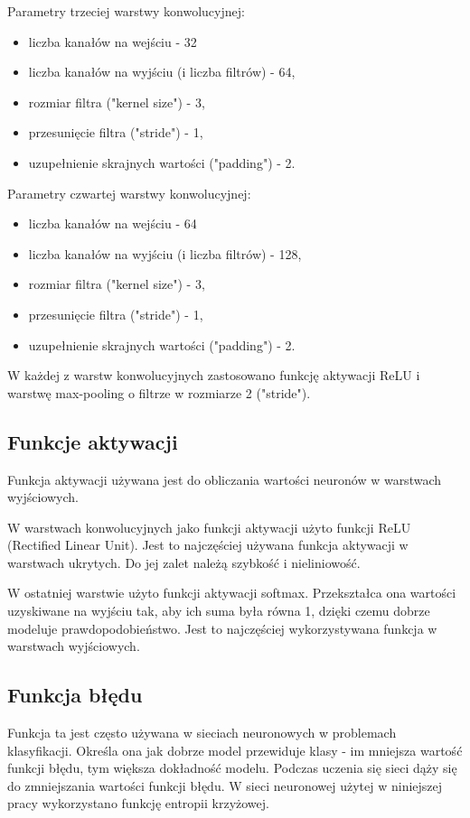 \documentclass{sprz}
\begin{document}
Parametry trzeciej warstwy konwolucyjnej:
\begin{itemize}
  \item{liczba kanałów na wejściu - 32}
  \item{liczba kanałów na wyjściu (i liczba filtrów) - 64,}
  \item{rozmiar filtra ("kernel size") - 3,}
  \item {przesunięcie filtra ("stride") - 1,}
  \item{uzupełnienie skrajnych wartości ("padding") - 2.}
\end{itemize}

Parametry czwartej warstwy konwolucyjnej:
\begin{itemize}
  \item{liczba kanałów na wejściu - 64}
  \item{liczba kanałów na wyjściu (i liczba filtrów) - 128,}
  \item{rozmiar filtra ("kernel size") - 3,}
  \item {przesunięcie filtra ("stride") - 1,}
  \item{uzupełnienie skrajnych wartości ("padding") - 2.}
\end{itemize}

W każdej z warstw konwolucyjnych zastosowano funkcję aktywacji ReLU i warstwę max-pooling o filtrze w rozmiarze 2 ("stride").

\subsection{Funkcje aktywacji}
Funkcja aktywacji używana jest do obliczania wartości neuronów w warstwach wyjściowych.

W warstwach konwolucyjnych jako funkcji aktywacji użyto funkcji ReLU (Rectified Linear Unit). Jest to najczęściej używana funkcja aktywacji w warstwach ukrytych. Do jej zalet należą szybkość i nieliniowość.

W ostatniej warstwie użyto funkcji aktywacji softmax. Przekształca ona wartości uzyskiwane na wyjściu tak, aby ich suma była równa 1, dzięki czemu dobrze modeluje prawdopodobieństwo. Jest to najczęściej wykorzystywana funkcja w warstwach wyjściowych.

\subsection{Funkcja błędu}
Funkcja ta jest często używana w sieciach neuronowych w problemach klasyfikacji. Określa ona jak dobrze model przewiduje klasy - im mniejsza wartość funkcji błędu, tym większa dokładność modelu. Podczas uczenia się sieci dąży się do zmniejszania wartości funkcji błędu. W sieci neuronowej użytej w niniejszej pracy wykorzystano funkcję entropii krzyżowej.
\end{document}
